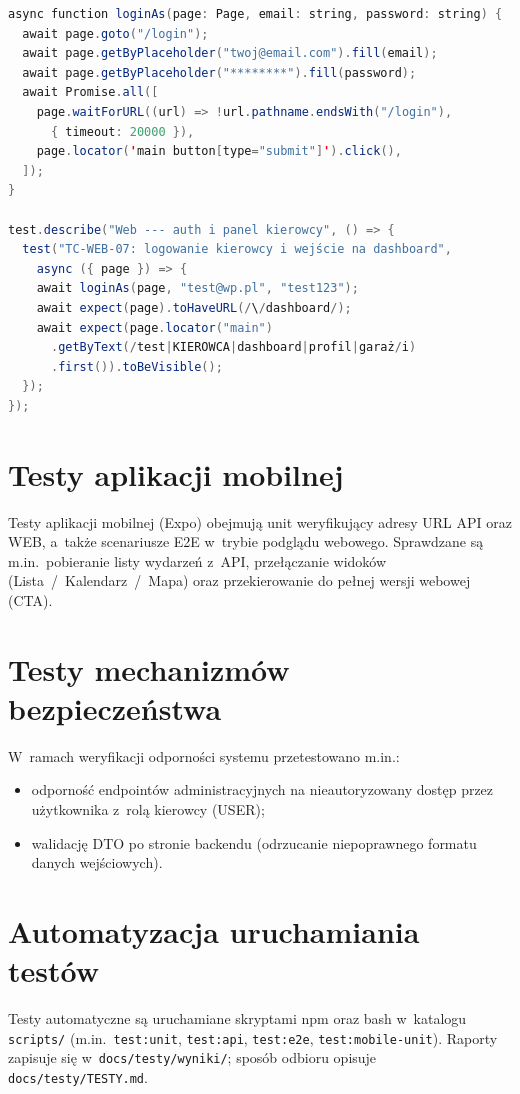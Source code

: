 \documentclass{sprz}
\begin{document}
\begin{lstlisting}[language=Java,caption={Funkcja \texttt{loginAs} oraz test \texttt{TC-WEB-07} (Playwright).},label={lst:ch14-web-auth}]
async function loginAs(page: Page, email: string, password: string) {
  await page.goto("/login");
  await page.getByPlaceholder("twoj@email.com").fill(email);
  await page.getByPlaceholder("********").fill(password);
  await Promise.all([
    page.waitForURL((url) => !url.pathname.endsWith("/login"),
      { timeout: 20000 }),
    page.locator('main button[type="submit"]').click(),
  ]);
}

test.describe("Web --- auth i panel kierowcy", () => {
  test("TC-WEB-07: logowanie kierowcy i wejście na dashboard",
    async ({ page }) => {
    await loginAs(page, "test@wp.pl", "test123");
    await expect(page).toHaveURL(/\/dashboard/);
    await expect(page.locator("main")
      .getByText(/test|KIEROWCA|dashboard|profil|garaż/i)
      .first()).toBeVisible();
  });
});
\end{lstlisting}

\section{Testy aplikacji mobilnej}
Testy aplikacji mobilnej (Expo) obejmują unit weryfikujący adresy URL API oraz WEB, a~także scenariusze E2E w~trybie podglądu webowego. Sprawdzane są m.in.\ pobieranie listy wydarzeń z~API, przełączanie widoków (Lista~/~Kalendarz~/~Mapa) oraz przekierowanie do pełnej wersji webowej (CTA).

\section{Testy mechanizmów bezpieczeństwa}
W~ramach weryfikacji odporności systemu przetestowano m.in.:
\begin{itemize}
  \item odporność endpointów administracyjnych na nieautoryzowany dostęp przez użytkownika z~rolą kierowcy (USER);
  \item walidację DTO po stronie backendu (odrzucanie niepoprawnego formatu danych wejściowych).
\end{itemize}

\section{Automatyzacja uruchamiania testów}
Testy automatyczne są uruchamiane skryptami npm oraz bash w~katalogu \texttt{scripts/} (m.in.\ \texttt{test:unit}, \texttt{test:api}, \texttt{test:e2e}, \texttt{test:mobile-unit}). Raporty zapisuje się w~\texttt{docs/\allowbreak testy/\allowbreak wyniki/}; sposób odbioru opisuje \texttt{docs/\allowbreak testy/\allowbreak TESTY.md}.
\end{document}
